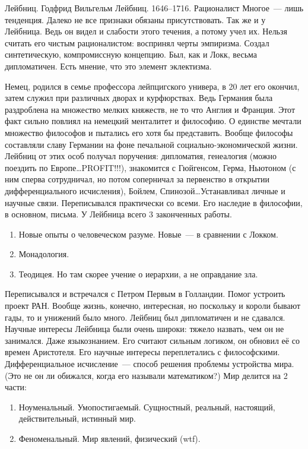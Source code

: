 Лейбниц. Годфрид Вильгельм Лейбниц. 1646--1716. Рационалист
Многое~--- лишь тенденция. Далеко не все признаки обязаны присутствовать. Так же и у Лейбница. Ведь он видел и слабости этого течения, а потому учел их. Нельзя считать его чистым рационалистом: воспринял черты эмпиризма. Создал синтетическую, компромиссную концепцию. Был, как и Локк, весьма дипломатичен. Есть мнение, что это элемент эклектизма.

Немец, родился в семье профессора лейпцигского универа, в 20 лет его окончил, затем служил при различных дворах и курфюрствах. Ведь Германия была раздроблена на множество мелких княжеств, не то что Англия и Франция. Этот факт сильно повлиял на немецкий менталитет и философию. О единстве мечтали множество философов и пытались его хотя бы представить. Вообще философы составляли славу Германии на фоне печальной социально-экономической жизни. Лейбниц от этих особ получал поручения: дипломатия, генеалогия (можно поездить по Европе\ldots PROFIT!!!), знакомится с Гюйгенсом, Герма, Ньютоном (с ним сперва сотрудничал, но потом соперничал за первенство в открытии дифференциального исчисления), Бойлем, Спинозой\ldots Устанавливал личные и научные связи. Переписывался практически со всеми. Его наследие в философии, в основном, письма. У Лейбница всего 3 законченных работы.
\begin{enumerate}
	\item Новые опыты о человеческом разуме. Новые~--- в сравнении с Локком.
	\item Монадология.
	\item Теодицея. Но там скорее учение о иерархии, а не оправдание зла.
\end{enumerate}
	
Переписывался и встречался с Петром Первым в Голландии. Помог устроить проект РАН. Вообще жизнь, конечно, интересная, но поскольку и короли бывают гады, то и унижений было много. Лейбниц был дипломатичен и не сдавался.
Научные интересы Лейбница были очень широки: тяжело назвать, чем он не занимался. Даже языкознанием. Его считают сильным логиком, он обновил её со времен Аристотеля. Его научные интересы переплетались с философскими. Дифференциальное исчисление~--- способ решения проблемы устройства мира. (Это не он ли обижался, когда его называли математиком?) 
Мир делится на 2 части: 
\begin{enumerate}
	\item Ноуменальный. Умопостигаемый. Сущностный, реальный, настоящий, действительный, истинный мир.
	\item Феноменальный. Мир явлений, физический (wtf). 
\end{enumerate}

